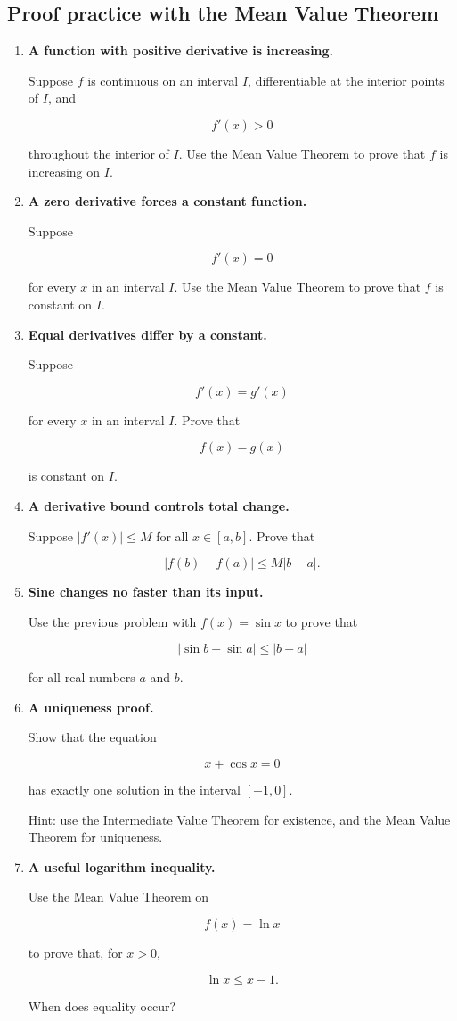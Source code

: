 \subsection{Proof practice with the Mean Value Theorem}
\label{subsec:proof-practice-mvt}

\begin{enumerate}
\item \textbf{A function with positive derivative is increasing.}

Suppose \(f\) is continuous on an interval \(I\), differentiable at the interior points
of \(I\), and

\[
f'(x)>0
\]

throughout the interior of \(I\).  Use the Mean Value Theorem to prove that \(f\) is
increasing on \(I\).

\item \textbf{A zero derivative forces a constant function.}

Suppose

\[
f'(x)=0
\]

for every \(x\) in an interval \(I\).  Use the Mean Value Theorem to prove that \(f\)
is constant on \(I\).

\item \textbf{Equal derivatives differ by a constant.}

Suppose

\[
f'(x)=g'(x)
\]

for every \(x\) in an interval \(I\).  Prove that

\[
f(x)-g(x)
\]

is constant on \(I\).

\item \textbf{A derivative bound controls total change.}

Suppose \(|f'(x)|\le M\) for all \(x\in[a,b]\).  Prove that

\[
|f(b)-f(a)|\le M|b-a|.
\]

\item \textbf{Sine changes no faster than its input.}

Use the previous problem with \(f(x)=\sin x\) to prove that

\[
|\sin b-\sin a|\le |b-a|
\]

for all real numbers \(a\) and \(b\).

\item \textbf{A uniqueness proof.}

Show that the equation

\[
x+\cos x=0
\]

has exactly one solution in the interval \([-1,0]\).

Hint: use the Intermediate Value Theorem for existence, and the Mean Value Theorem
for uniqueness.

\item \textbf{A useful logarithm inequality.}

Use the Mean Value Theorem on

\[
f(x)=\ln x
\]

to prove that, for \(x>0\),

\[
\ln x \le x-1.
\]

When does equality occur?
\end{enumerate}

